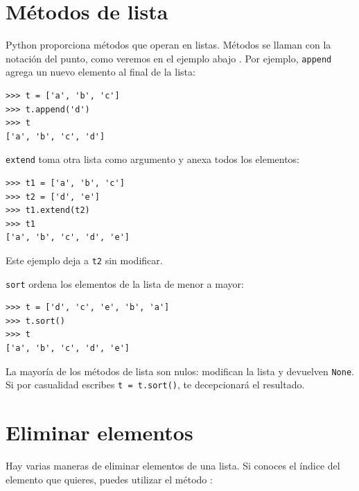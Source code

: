 \section{Métodos de lista}

Python proporciona métodos que operan en listas.  
Métodos se llaman con la notación del punto, como veremos en el ejemplo abajo
.
Por ejemplo,
\texttt{append} agrega un nuevo elemento al final de la lista:

\begin{Verbatim}[frame=single]
>>> t = ['a', 'b', 'c']
>>> t.append('d')
>>> t
['a', 'b', 'c', 'd']
\end{Verbatim}



\texttt{extend} toma otra lista como argumento y anexa todos
los elementos:

\begin{Verbatim}[frame=single]
>>> t1 = ['a', 'b', 'c']
>>> t2 = ['d', 'e']
>>> t1.extend(t2)
>>> t1
['a', 'b', 'c', 'd', 'e']
\end{Verbatim}
%
Este ejemplo deja a \texttt{t2} sin modificar.

\texttt{sort} ordena los elementos de la lista de menor a mayor:

\begin{Verbatim}[frame=single]
>>> t = ['d', 'c', 'e', 'b', 'a']
>>> t.sort()
>>> t
['a', 'b', 'c', 'd', 'e']
\end{Verbatim}
%
La mayoría de los métodos de lista son nulos: modifican la lista y devuelven \texttt{None}.
Si por casualidad escribes \texttt{t = t.sort()}, te decepcionará
el resultado.




\section{Eliminar elementos}

Hay varias maneras de eliminar elementos de una lista.  Si conoces
el índice del elemento que quieres, puedes utilizar el método
:

